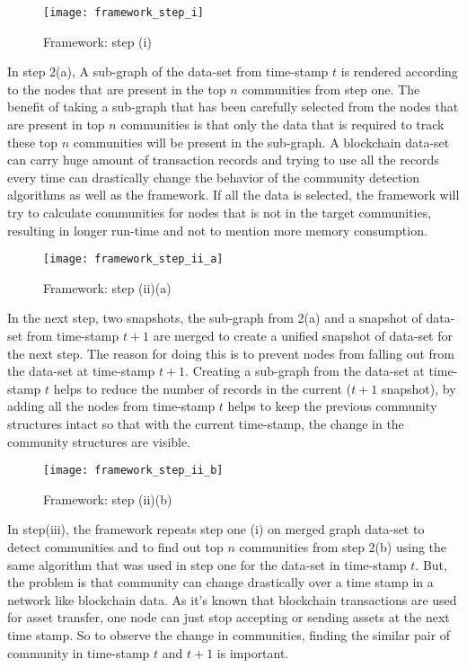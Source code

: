 \begin{figure}[H]
	\centering
	\texttt{[image: framework\_step\_i]}
	\caption{Framework: step (i)}
	\label{fig:community}
\end{figure}

In step 2(a), A sub-graph of the data-set from time-stamp $t$ is rendered according to the nodes that are present in the top $n$ communities from step one. The benefit of taking a sub-graph that has been carefully selected from the nodes that are present in top $n$ communities is that only the data that is required to track these top $n$ communities will be present in the sub-graph. A blockchain data-set can carry huge amount of transaction records and trying to use all the records every time can drastically change the behavior of the community detection algorithms as well as the framework. If all the data is selected, the framework will try to calculate communities for nodes that is not in the target communities, resulting in longer run-time and not to mention more memory consumption.

\begin{figure}[H]
	\centering
	\texttt{[image: framework\_step\_ii\_a]}
	\caption{Framework: step (ii)(a)}
	\label{fig:community}
\end{figure}

In the next step, two snapshots, the sub-graph from 2(a) and a snapshot of data-set from time-stamp $t+1$ are merged to create a unified snapshot of data-set for the next step. The reason for doing this is to prevent nodes from falling out from the data-set at time-stamp $t+1$. Creating a sub-graph from the data-set at time-stamp $t$ helps to reduce the number of records in the current ($t+1$ snapshot), by  adding all the nodes from time-stamp $t$ helps to keep the previous community structures intact so that with the current time-stamp, the change in the community structures are visible.

\begin{figure}[H]
	\centering
	\texttt{[image: framework\_step\_ii\_b]}
	\caption{Framework: step (ii)(b)}
	\label{fig:community}
\end{figure}

In step(iii), the framework repeats step one (i) on merged graph data-set to detect communities and to find out top $n$ communities from step 2(b) using the same algorithm that was used in step one for the data-set in time-stamp $t$. But, the problem is that community can change drastically over a time stamp in a network like blockchain data. As it's known that blockchain transactions are used for asset transfer, one node can just stop accepting or sending assets at the next time stamp. So to observe the change in communities, finding the similar pair of community in time-stamp $t$ and $t+1$ is important.

